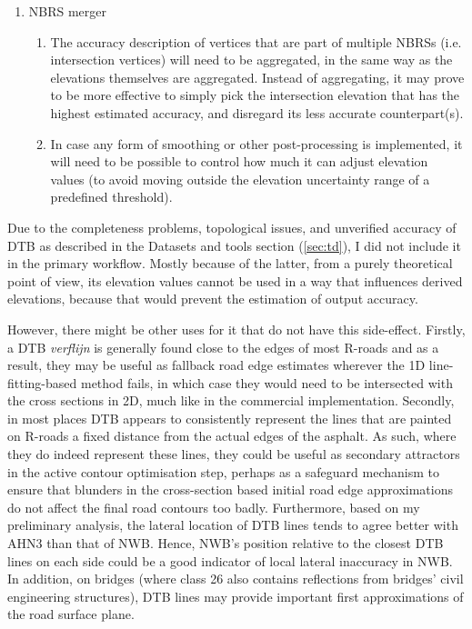 \begin{enumerate}
\begin{enumerate}
    \end{enumerate}
    \item NBRS merger
    \begin{enumerate}
        \item The accuracy description of vertices that are part of multiple NBRSs (i.e. intersection vertices) will need to be aggregated, in the same way as the elevations themselves are aggregated. Instead of aggregating, it may prove to be more effective to simply pick the intersection elevation that has the highest estimated accuracy, and disregard its less accurate counterpart(s).
        \item In case any form of smoothing or other post-processing is implemented, it will need to be possible to control how much it can adjust elevation values (to avoid moving outside the elevation uncertainty range of a predefined threshold).
    \end{enumerate}
\end{enumerate}

Due to the completeness problems, topological issues, and unverified accuracy of DTB as described in the Datasets and tools section (\ref{sec:td}), I did not include it in the primary workflow. Mostly because of the latter, from a purely theoretical point of view, its elevation values cannot be used in a way that influences derived elevations, because that would prevent the estimation of output accuracy. 

However, there might be other uses for it that do not have this side-effect. Firstly, a DTB \textit{verflijn} is generally found close to the edges of most R-roads and as a result, they may be useful as fallback road edge estimates wherever the 1D line-fitting-based method fails, in which case they would need to be intersected with the cross sections in 2D, much like in the commercial implementation. Secondly, in most places DTB appears to consistently represent the lines that are painted on R-roads a fixed distance from the actual edges of the asphalt. As such, where they do indeed represent these lines, they could be useful as secondary attractors in the active contour optimisation step, perhaps as a safeguard mechanism to ensure that blunders in the cross-section based initial road edge approximations do not affect the final road contours too badly. Furthermore, based on my preliminary analysis, the lateral location of DTB lines tends to agree better with AHN3 than that of NWB. Hence, NWB’s position relative to the closest DTB lines on each side could be a good indicator of local lateral inaccuracy in NWB. In addition, on bridges (where class 26 also contains reflections from bridges’ civil engineering structures), DTB lines may provide important first approximations of the road surface plane.

